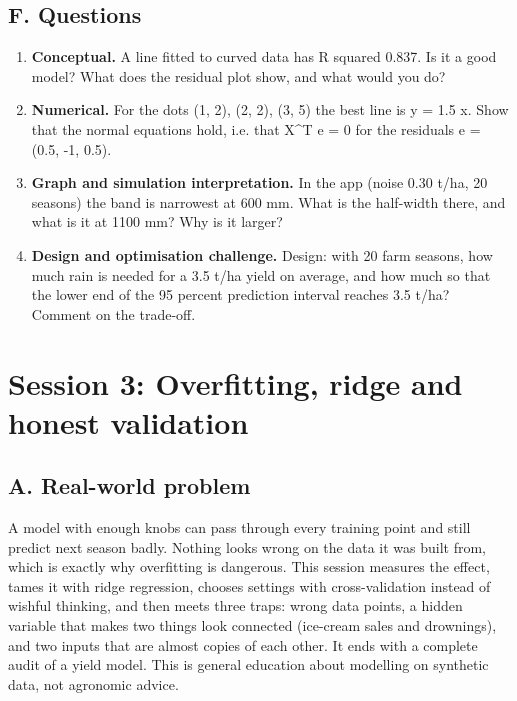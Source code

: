 \documentclass[11pt,a4paper]{article}
\begin{document}
\subsection*{F. Questions}
\begin{enumerate}[nosep]
\item \textbf{Conceptual.} A line fitted to curved data has R squared 0.837. Is it a good model? What does the residual plot show, and what would you do?
\item \textbf{Numerical.} For the dots (1, 2), (2, 2), (3, 5) the best line is y = 1.5 x. Show that the normal equations hold, i.e. that X\textasciicircum{}T e = 0 for the residuals e = (0.5, -1, 0.5).
\item \textbf{Graph and simulation interpretation.} In the app (noise 0.30 t/ha, 20 seasons) the band is narrowest at 600 mm. What is the half-width there, and what is it at 1100 mm? Why is it larger?
\item \textbf{Design and optimisation challenge.} Design: with 20 farm seasons, how much rain is needed for a 3.5 t/ha yield on average, and how much so that the lower end of the 95 percent prediction interval reaches 3.5 t/ha? Comment on the trade-off.
\end{enumerate}

\section{Session 3: Overfitting, ridge and honest validation}

\subsection*{A. Real-world problem}
A model with enough knobs can pass through every training point and still predict next season badly. Nothing looks wrong on the data it was built from, which is exactly why overfitting is dangerous. This session measures the effect, tames it with ridge regression, chooses settings with cross-validation instead of wishful thinking, and then meets three traps: wrong data points, a hidden variable that makes two things look connected (ice-cream sales and drownings), and two inputs that are almost copies of each other. It ends with a complete audit of a yield model. This is general education about modelling on synthetic data, not agronomic advice.
\end{document}
